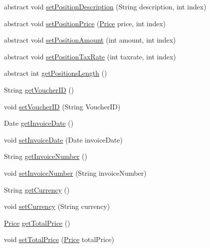 \begin{DoxyCompactItemize}
abstract void \hyperlink{class_reduced_invoice_1_1_a_invoice_a01a6d1c001117851fdcb6941a117c086}{set\+Position\+Description} (String description, int index)
\item 
abstract void \hyperlink{class_reduced_invoice_1_1_a_invoice_a0fb3b8175eac0e76c906a986ba7d6161}{set\+Position\+Price} (\hyperlink{class_reduced_invoice_1_1_price}{Price} price, int index)
\item 
abstract void \hyperlink{class_reduced_invoice_1_1_a_invoice_aef6af27bf12024c16e8e5890243825eb}{set\+Position\+Amount} (int amount, int index)
\item 
abstract void \hyperlink{class_reduced_invoice_1_1_a_invoice_a5919a1c5d917fc62d654441f582f470e}{set\+Position\+Tax\+Rate} (int taxrate, int index)
\item 
abstract int \hyperlink{class_reduced_invoice_1_1_a_invoice_a109ff7a484de183356ebe38737556f11}{get\+Positions\+Length} ()
\item 
String \hyperlink{class_reduced_invoice_1_1_a_invoice_ae420c9c0e825a538be46f1fce2c18c57}{get\+Voucher\+ID} ()
\item 
void \hyperlink{class_reduced_invoice_1_1_a_invoice_a042790fb1b2c097d0da994c255fa9dc4}{set\+Voucher\+ID} (String Voucher\+ID)
\item 
Date \hyperlink{class_reduced_invoice_1_1_a_invoice_ac78ce56c3ae003ca87e8144546d7ec3f}{get\+Invoice\+Date} ()
\item 
void \hyperlink{class_reduced_invoice_1_1_a_invoice_adefa18f4aec87c1d4b89233baf6ce9ee}{set\+Invoice\+Date} (Date invoice\+Date)
\item 
String \hyperlink{class_reduced_invoice_1_1_a_invoice_a09231d505794762ea8f363e4689392c8}{get\+Invoice\+Number} ()
\item 
void \hyperlink{class_reduced_invoice_1_1_a_invoice_a20d784a1da556e7bb3c5538c5a6701c4}{set\+Invoice\+Number} (String invoice\+Number)
\item 
String \hyperlink{class_reduced_invoice_1_1_a_invoice_a2c0175f8fdd6c21504bdf6f8e3336cc2}{get\+Currency} ()
\item 
void \hyperlink{class_reduced_invoice_1_1_a_invoice_a83a6ba629194d28ea32c24275d0e14ba}{set\+Currency} (String currency)
\item 
\hyperlink{class_reduced_invoice_1_1_price}{Price} \hyperlink{class_reduced_invoice_1_1_a_invoice_aedc84169ce345d6f7c72b808c305c27b}{get\+Total\+Price} ()
\item 
void \hyperlink{class_reduced_invoice_1_1_a_invoice_ac5c395d78cb3bd54e8e40678bdb46bf0}{set\+Total\+Price} (\hyperlink{class_reduced_invoice_1_1_price}{Price} total\+Price)

\end{DoxyCompactItemize}
